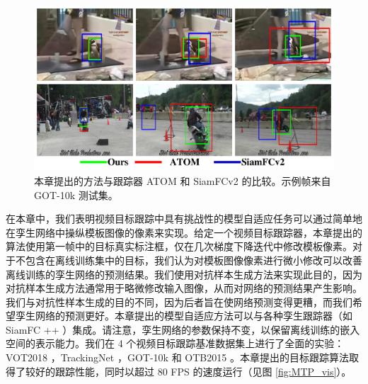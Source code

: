 \begin{figure}[t]
    \centering
    \includegraphics[width=1.0\textwidth]{Img/MTP/got10k/visulization2.pdf}
    \caption{本章提出的方法与跟踪器 ATOM \cite{danelljan2019atom} 和 SiamFCv2 \cite{SiamFC} 的比较。示例帧来自 GOT-10k \cite{GOT-10k} 测试集。}
    \label{fig:MTP_vis1}
\end{figure}

在本章中，我们表明视频目标跟踪中具有挑战性的模型自适应任务可以通过简单地在孪生网络中操纵模板图像的像素来实现。给定一个视频目标跟踪器，本章提出的算法使用第一帧中的目标真实标注框，仅在几次梯度下降迭代中修改模板像素。对于不包含在离线训练集中的目标，我们认为对模板图像像素进行微小修改可以改善离线训练的孪生网络的预测结果。我们使用对抗样本生成方法来实现此目的，因为对抗样本生成方法通常用于略微修改输入图像，从而对网络的预测结果产生影响。我们与对抗性样本生成的目的不同，因为后者旨在使网络预测变得更糟，而我们希望孪生网络的预测更好。本章提出的模型自适应方法可以与各种孪生跟踪器（如 SiamFC ++ \cite{SiamFC++}）集成。请注意，孪生网络的参数保持不变，以保留离线训练的嵌入空间的表示能力。我们在 4 个视频目标跟踪基准数据集上进行了全面的实验：VOT2018 \cite{kristan2018sixth}，TrackingNet \cite{muller2018trackingnet}，GOT-10k \cite{GOT-10k} 和 OTB2015 \cite{OTB}。本章提出的目标跟踪算法取得了较好的跟踪性能，同时以超过 80 FPS 的速度运行（见图 \ref{fig:MTP_vis}）。
